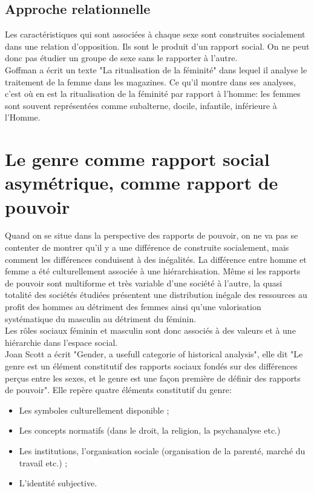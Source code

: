 \documentclass[12pt, a4paper, openany]{book}
\begin{document}
\subsection{Approche relationnelle}

Les caractéristiques qui sont associées à chaque sexe sont construites socialement dans une relation d'opposition. Ils sont le produit d'un rapport social. On ne peut donc pas étudier un groupe de sexe sans le rapporter à l'autre. \\
Goffman a écrit un texte "La ritualisation de la féminité" dans lequel il analyse le traitement de la femme dans les magazines. Ce qu'il montre dans ses analyses, c'est où en est la ritualisation de la féminité par rapport à l'homme: les femmes sont souvent représentées comme subalterne, docile, infantile, inférieure à l'Homme.

\section{Le genre comme rapport social asymétrique, comme rapport de pouvoir}

Quand on se situe dans la perspective des rapports de pouvoir, on ne va pas se contenter de montrer qu'il y a une différence de construite socialement, mais comment les différences conduisent à des inégalités. La différence entre homme et femme a été culturellement associée à une hiérarchisation. Même si les rapports de pouvoir sont multiforme et très variable d'une société à l'autre, la quasi totalité des sociétés étudiées présentent une distribution inégale des ressources au profit des hommes au détriment des femmes ainsi qu'une valorisation systématique du masculin au détriment du féminin. \\
Les rôles sociaux féminin et masculin sont donc associés à des valeurs et à une hiérarchie dans l'espace social. \\
Joan Scott a écrit "Gender, a usefull categorie of historical analysis", elle dit "Le genre est un élément constitutif des rapports sociaux fondés sur des différences perçus entre les sexes, et le genre est une façon première de définir des rapports de pouvoir". Elle repère quatre éléments constitutif du genre:
\begin{itemize}
\item Les symboles culturellement disponible ;
\item Les concepts normatifs (dans le droit, la religion, la psychanalyse etc.)
\item Les institutions, l'organisation sociale (organisation de la parenté, marché du travail etc.) ;
\item L'identité subjective. 
\end{itemize}
\end{document}
